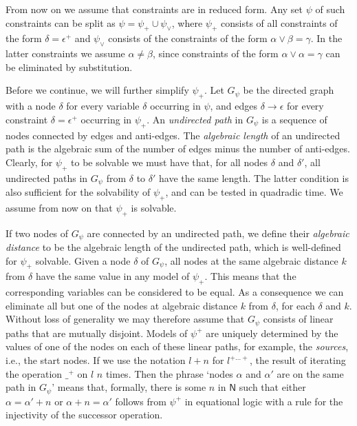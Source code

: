 \documentclass[11pt,a4paper]{article}
\def\NN{\mathsf{N}}
\begin{document}
From now on we assume that constraints are in reduced form.
Any set  $\psi$ of such constraints can be split as $ \psi= \psi_+ \cup  \psi_\vee$,
where $ \psi_+$ consists of all constraints of the form  
$\delta = \epsilon^+$ and $ \psi_\vee$ consists of the constraints of the form $\alpha\vee\beta = \gamma$.
In the latter constraints we assume $\alpha\neq\beta$, since constraints of the form
$\alpha \vee \alpha = \gamma$ can be eliminated by substitution.

Before we continue, we will further simplify $ \psi_+$.
Let $G_ \psi$ be the directed graph with a node $\delta$ for every
variable $\delta$ occurring in  $\psi$, and edges $\delta\to\epsilon$
for every constraint $\delta = \epsilon^+$ occurring in $ \psi_+$.
An \emph{undirected path} in $G_ \psi$ is a sequence of nodes connected
by edges and anti-edges.
The \emph{algebraic length} of an undirected path is the algebraic sum 
of the number of edges minus the number of anti-edges.
Clearly, for $ \psi_+$ to be solvable we must have that,
for all nodes $\delta$ and $\delta'$,
all undirected paths in $G_ \psi$ from $\delta$ to $\delta'$ have the same length.
The latter condition is also sufficient for the solvability of $ \psi_+$,
and can be tested in quadradic time. 
We assume from now on that $ \psi_+$ is solvable.

If two nodes of $G_ \psi$ are connected by an undirected path,
we define their \emph{algebraic distance} to be the algebraic length of
the undirected path, which is well-defined for $ \psi_+$ solvable. 
Given a node $\delta$ of $G_ \psi$, all nodes at the same algebraic distance $k$ from 
$\delta$ have the same value in any model of $ \psi_+$. 
This means that the corresponding variables can be considered to be equal.
As a consequence we can eliminate all but one of the nodes at 
algebraic distance $k$ from $\delta$, for each $\delta$ and $k$.
Without loss of generality we may therefore assume that $G_ \psi$ consists 
of linear paths that are mutually disjoint.
Models of $ \psi^+$ are uniquely determined by the values of 
one of the nodes on each of these linear paths, for example,
the \emph{sources}, i.e., the start nodes. If we use the notation $l + n$ for $l^{+\ldots +}$, the result of iterating the operation $\_^+$ on $l$ $n$ times. Then
the phrase `nodes $\alpha$ and $\alpha'$ are on the same path in $G_ \psi$'
means that, formally, there is some $n$ in $\NN$ such that
either $\alpha=\alpha'+n$ or $\alpha+n=\alpha'$ follows from $ \psi^+$
in equational logic with a rule for the injectivity of the successor operation.
\end{document}
